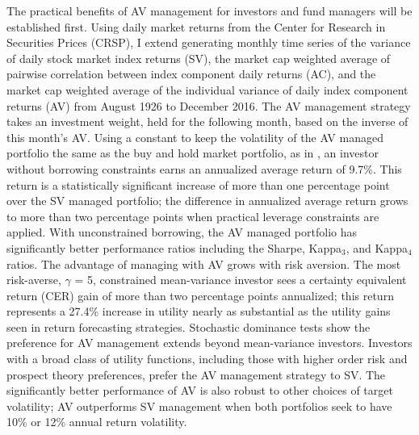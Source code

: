 The practical benefits of AV management for investors and fund managers will be established first. Using daily market returns from the Center for Research in Securities Prices (CRSP), I extend \citet{pollet_average_2010} generating monthly time series of the variance of daily stock market index returns (SV), the market cap weighted average of pairwise correlation between index component daily returns (AC), and the market cap weighted average of the individual variance of daily index component returns (AV) from August 1926 to December 2016. The AV management strategy takes an investment weight, held for the following month, based on the inverse of this month's AV. Using a constant to keep the volatility of the AV managed portfolio the same as the buy and hold market portfolio, as in \citet{moreira_volatility-managed_2017}, an investor without borrowing constraints earns an annualized average return of 9.7\%. This return is a statistically significant increase of more than one percentage point over the SV managed portfolio; the difference in annualized average return grows to more than two percentage points when practical leverage constraints are applied. With unconstrained borrowing, the AV managed portfolio has significantly better performance ratios including the Sharpe, Kappa$_{3}$, and Kappa$_{4}$ ratios.%
The advantage of managing with AV grows with risk aversion. The most risk-averse, $\gamma$ = 5, constrained mean-variance investor sees a certainty equivalent return (CER) gain of more than two percentage points annualized; this return represents a 27.4\% increase in utility nearly as substantial as the utility gains seen in return forecasting strategies. \citep{campbell1997econometrics} Stochastic dominance tests show the preference for AV management extends beyond mean-variance investors. Investors with a broad class of utility functions, including those with higher order risk and prospect theory preferences, prefer the AV management strategy to SV. 
The significantly better performance of AV is also robust to other choices of target volatility; AV outperforms SV management when both portfolios seek to have 10\% or 12\% annual return volatility. 

